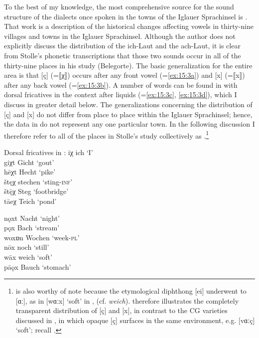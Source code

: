 {To the best of my knowledge, the most comprehensive source for the sound structure of the dialects once spoken in the towns of the Iglauer Sprachinsel is \citet{Stolle1969}. That work is a description of the historical changes affecting vowels in thirty-nine villages and towns in the Iglauer Sprachinsel. Although the author does not explicitly discuss the distribution of the ich-Laut and the ach-Laut, it is clear from Stolle’s phonetic transcriptions that those two sounds occur in all of the thirty-nine places in his study (Belegorte). The basic generalization for the entire area is that [ç] (=⟦χ⟧) occurs after any front vowel (=\ref{ex:15:3a}) and [x] (=⟦x⟧) after any back vowel (=\ref{ex:15:3b}). A number of words can be found in \citet{Stolle1969} with dorsal fricatives in the context after liquids (=\ref{ex:15:3c}, \ref{ex:15:3d}), which I discuss in greater detail below. The generalizations concerning the distribution of [ç] and [x] do not differ from place to place within the Iglauer Sprachinsel; hence, the data in  do not represent any one particular town. In the following discussion I therefore refer to all of the places in Stolle’s study collectively as .\footnote{{ is also worthy of note because the etymological diphthong [ei] underwent  to [ɑː], as in [wɑːx] ‘soft’ in , (cf. } \textrm{\textit{weich}}\textrm{).  therefore illustrates the completely transparent distribution of [ç] and [x], in contrast to the CG varieties discussed in , in which opaque [ç] surfaces in the same environment, e.g.  [vɑːç] ‘soft’; recall .}}

\ea%
\label{ex:15:3}Dorsal fricatives in :
\ea\label{ex:15:3a} iχ  \tab  [ɪç] \tab ich \tab ‘I’ \\
giχt  \tab  [giçt] \tab Gicht \tab ‘gout’ \\
hēχt \tab [heːçt] \tab Hecht \tab ‘pike’ \\
štęχ  \tab  [ʃtɛç] \tab stechen \tab ‘sting\textsc{{}-inf}’ \\
št\={ę}χ  \tab  [ʃtɛːç] \tab Steg \tab ‘footbridge’ \\
tāeχ  \tab  [tɑːeç] \tab Teich \tab ‘pond’ 

\ex\label{ex:15:3b} nǫxt \tab [nɔxt] \tab Nacht \tab ‘night’ \\
  pǫx  \tab  [pɔːx] \tab Bach \tab ‘stream’ \\
  woxɒn \tab [woxɒn] \tab Wochen \tab ‘week-\textsc{pl}’ \\
  nōx  \tab  [noːx] \tab noch \tab ‘still’ \\
  wāx \tab [wɑːx] \tab weich \tab ‘soft’ \\
  pāǫx \tab [pɑːɔx] \tab Bauch \tab ‘stomach’ 

}
